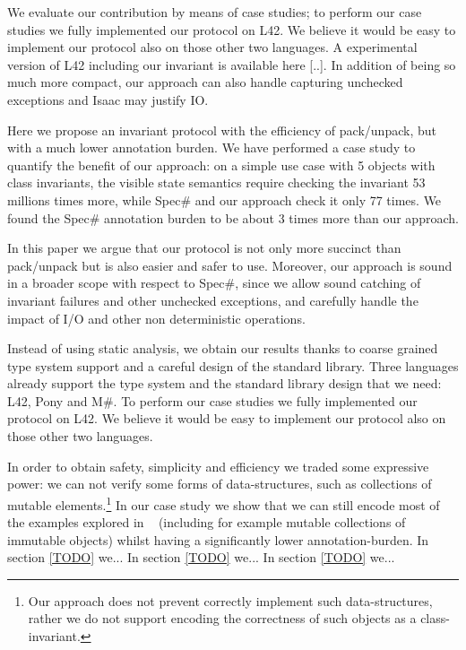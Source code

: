 We evaluate our contribution by means of case studies;
to perform our case studies we fully implemented our protocol on L42.
We believe it would be easy to implement our protocol also on those other two languages.
A experimental version of L42 including our invariant is available here [..].
In addition of being so much more compact, our approach can also handle capturing unchecked exceptions
and Isaac may justify IO.


\LINE




Here we propose an invariant protocol with the 
efficiency of pack/unpack, but with a much lower annotation burden.
We have performed a case study to quantify the benefit of our approach:
on a simple use case with 5 objects with class invariants, the visible state semantics 
require checking the invariant 53 millions times more,
while Spec\# and our approach check it only 77 times.
We found the Spec\# annotation burden to be about 3 times more 
than our approach.

In this paper we argue that our protocol is not only more succinct than pack/unpack but is also easier and safer to use.
Moreover, our approach is sound in a broader scope with respect to Spec\#, since we allow sound catching of invariant failures and other unchecked exceptions, and carefully handle
the impact of I/O and other non deterministic operations.

Instead of using static analysis,
we obtain our results thanks to coarse grained type system support and a careful design of the standard library. Three languages already support the type system and the standard library design that we need:
L42, Pony and M\#. To perform our case studies we fully implemented our protocol on L42.
We believe it would be easy to implement our protocol also on those other two languages.

In order to obtain safety, simplicity and efficiency we traded some expressive power:
we can not verify some forms of data-structures, such as collections of mutable elements.\footnote{Our approach does not prevent correctly implement such data-structures, rather we do not support encoding the correctness of such objects as a class-invariant.}
In our case study we show that
we can still encode most of the examples explored in ~\cite{???} (including for example mutable collections of immutable objects) whilst having a significantly lower annotation-burden.
In section \ref{TODO} we...
In section \ref{TODO} we...
In section \ref{TODO} we...

